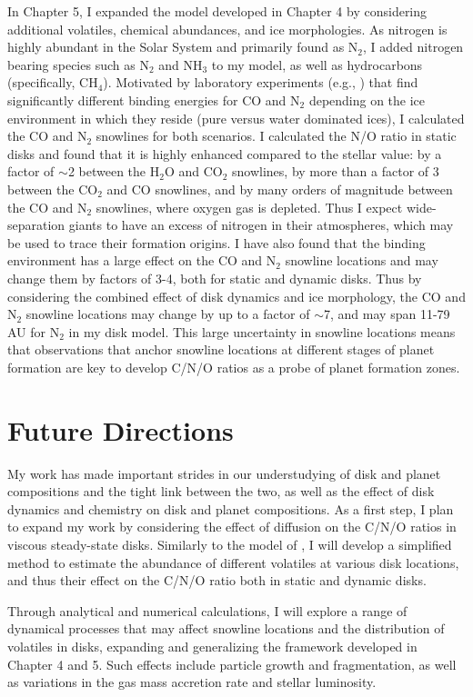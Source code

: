 In Chapter 5, I expanded the model developed in Chapter 4 by considering additional volatiles, chemical abundances, and ice morphologies. As nitrogen is highly abundant in the Solar System and primarily found as N$_2$, I added nitrogen bearing species such as N$_2$ and NH$_3$ to my model, as well as hydrocarbons (specifically, CH$_4$). Motivated by laboratory experiments (e.g., \citealt{fayolle16}) that find significantly different binding energies for CO and N$_2$ depending on the ice environment in which they reside (pure versus water dominated ices), I calculated the CO and N$_2$ snowlines for both scenarios. I calculated the N/O ratio in static disks and found that it is highly enhanced compared to the stellar value: by a factor of $\sim$2 between the H$_2$O and CO$_2$ snowlines, by more than a factor of 3 between the CO$_2$ and CO snowlines, and by many orders of magnitude between the CO and N$_2$ snowlines, where oxygen gas is depleted. Thus I expect wide-separation giants to have an excess of nitrogen in their atmospheres, which may be used to trace their formation origins. I have also found that the binding environment has a large effect on the CO and N$_2$ snowline locations and may change them by factors of 3-4, both for static and dynamic disks. Thus by considering the combined effect of disk dynamics and ice morphology, the CO and N$_2$ snowline locations may change by up to a factor of $\sim$7, and may span 11-79 AU for N$_2$ in my disk model. This large uncertainty in snowline locations means that observations that anchor snowline locations at different stages of planet
formation are key to develop C/N/O ratios as a probe of planet formation zones. 

\section{Future Directions}
\label{sec:future}

My work has made important strides in our understudying of disk and planet compositions and the tight link between the two, as well as the effect of disk dynamics and chemistry on disk and planet compositions. As a first step, I plan to expand my work by considering the effect of diffusion on the C/N/O ratios in viscous steady-state disks. Similarly to the model of \citet{owen14}, I will develop a simplified method to estimate the abundance of different volatiles at various disk locations, and thus their effect on the C/N/O ratio both in static and dynamic disks. 

Through analytical and numerical calculations, I will explore a range of dynamical processes that may affect snowline locations and the distribution of volatiles in disks, expanding and generalizing the framework developed in Chapter 4 and 5. Such effects include particle growth and fragmentation, as well as variations in the gas mass accretion rate and stellar luminosity.

